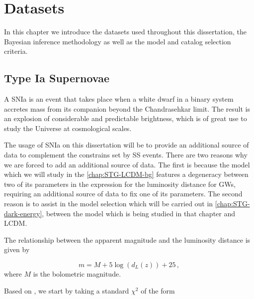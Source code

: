 \chapter{Datasets}
\label{chap:datasets}

In this chapter we introduce the datasets used throughout this dissertation, the Bayesian inference methodology as well as the model and catalog selection criteria.


\section{Type Ia Supernovae}
\label{sec:SNIa}

A \gls{SNIa} is an event that takes place when a white dwarf in a binary system accretes mass from its companion beyond the Chandrasehkar limit. The result is an explosion of considerable and predictable brightness, which is of great use to study the Universe at cosmological scales.

The usage of \gls{SNIa} on this dissertation will be to provide an additional source of data to complement the constrains set by \gls{SS} events. There are two reasons why we are forced to add an additional source of data. The first is because the model which we will study in the \cref{chap:STG-LCDM-bg} features a degeneracy between two of its parameters in the expression for the luminosity distance for \glspl{GW}, requiring an additional source of data to fix one of its parameters. The second reason is to assist in the model selection which will be carried out in \cref{chap:STG-dark-energy}, between the model which is being studied in that chapter and \gls{LCDM}.

The relationship between the apparent magnitude and the luminosity distance is given by

\begin{equation}
    \label{eq:m1}
    m = M + 5 \log{( d_L(z) )} + 25 \,,
\end{equation}
where $M$ is the bolometric magnitude.

Based on \cite{Goliath2001}, we start by taking a standard $\chi^2$ of the form

